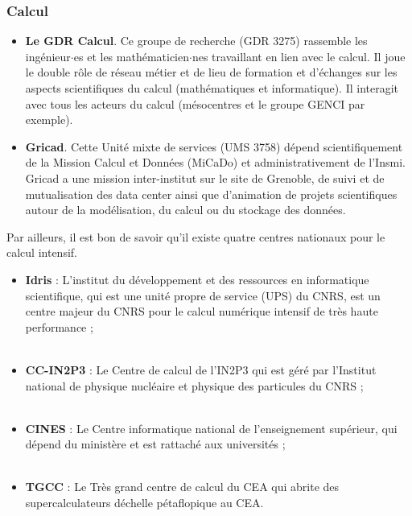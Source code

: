 \subsubsection{Calcul}

\begin{itemize}
\item {\bf Le GDR Calcul}. Ce groupe de recherche (GDR 3275) rassemble les ing\'enieur$\cdot$es et les math\'ematicien$\cdot$nes travaillant en lien avec le calcul. Il joue le double r\^ole de r\'eseau m\'etier et de lieu de formation et d'\'echanges sur les aspects scientifiques du calcul (math\'ematiques et informatique). Il interagit avec tous les acteurs du calcul (m\'esocentres et le groupe GENCI par exemple).\\
\item{\bf Gricad}. Cette Unit\'e mixte de services (UMS  3758) d\'epend scientifiquement de la Mission Calcul et Donn\'ees (MiCaDo) et administrativement de l'Insmi. Gricad a une mission inter-institut sur le site de Grenoble, de suivi et de mutualisation des data center ainsi que d'animation de projets scientifiques autour de la mod\'elisation, du calcul ou du stockage des donn\'ees.\\
\end{itemize}
Par ailleurs, il est bon de savoir qu'il existe quatre centres nationaux pour le calcul intensif.
\begin{itemize}
\item {\bf Idris} :
L'institut du d\'eveloppement et des ressources en informatique
scientifique, qui est une unit\'e propre de service (UPS) du
CNRS, est un centre majeur du CNRS pour le calcul num\'erique intensif
de tr\`es haute performance ; \\
\\
\item {\bf CC-IN2P3} : Le Centre de calcul de l'IN2P3 qui est g\'er\'e par l'Institut national de physique nucl\'eaire et physique des particules du CNRS ; \\
\\
\item {\bf CINES} : Le Centre informatique national de l'enseignement sup\'erieur,
qui d\'epend du minist\`ere et est rattach\'e aux universit\'es ;\\
\\
\item {\bf TGCC} : Le Tr\`es  grand centre de calcul du CEA  qui abrite des supercalculateurs d\'echelle p\'etaflopique au CEA. \\
\end{itemize}

